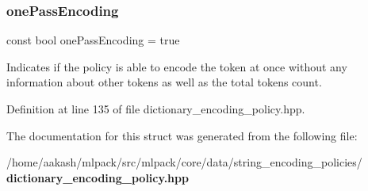 \subsubsection{one\+Pass\+Encoding}
{\footnotesize\ttfamily const bool one\+Pass\+Encoding = true\hspace{0.3cm}{\ttfamily [static]}}



Indicates if the policy is able to encode the token at once without any information about other tokens as well as the total tokens count. 



Definition at line 135 of file dictionary\+\_\+encoding\+\_\+policy.\+hpp.



The documentation for this struct was generated from the following file\+:\begin{DoxyCompactItemize}
\item 
/home/aakash/mlpack/src/mlpack/core/data/string\+\_\+encoding\+\_\+policies/\textbf{ dictionary\+\_\+encoding\+\_\+policy.\+hpp}\end{DoxyCompactItemize}
